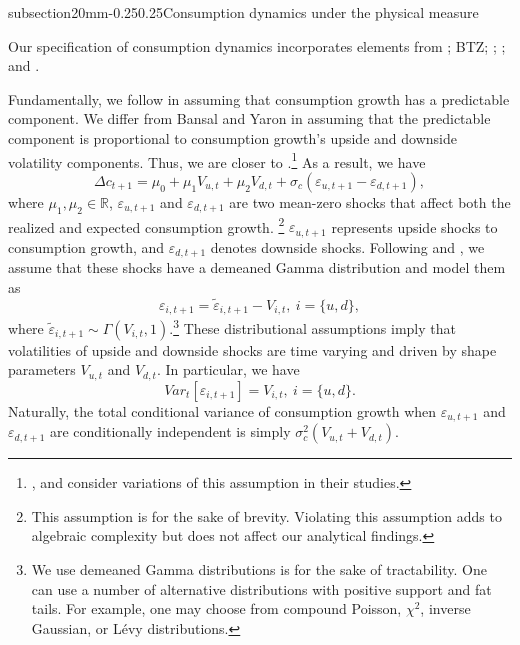 \documentclass[11pt]{article}
\makeatletter
\renewcommand\subsection{\@startsection%
    {subsection}{2}{0mm}{-0.25\baselineskip}{0.25\baselineskip}{\bfseries\large}}
\makeatother
\begin{document}
\subsection{Consumption dynamics under the physical measure}

Our specification of consumption dynamics incorporates elements from \cite%
{BansalYaron04JF}; BTZ; \cite{FJPT13RoF}; \cite{ShaliastovichYaronSegal14}; and \cite{BekaertEngstrom14}.

Fundamentally, we follow \cite{BansalYaron04JF} in assuming that consumption
growth has a predictable component. We differ from Bansal and Yaron in
assuming that the predictable component is proportional to consumption
growth's upside and downside volatility components. Thus, we are closer to \cite{ShaliastovichYaronSegal14}.\footnote{\cite{FJPT13RoF}, and \cite{BekaertEngstrom14} consider variations of this assumption in their studies.} As a result, we have
\begin{equation}  \label{EqConsGrowth}
\Delta c_{t+1} =
\mu_0+\mu_1V_{u,t}+\mu_2V_{d,t}+\sigma_c\left(\varepsilon_{u,t+1}-%
\varepsilon_{d,t+1}\right),
\end{equation}
where $\mu_1, \mu_2\in \mathbb{R}$, $\varepsilon_{u,t+1}$ and $\varepsilon_{d,t+1}$ are two mean-zero
shocks that affect both the realized and expected consumption growth.%
\footnote{%
This assumption is for the sake of brevity. Violating this assumption adds
to algebraic complexity but does not affect our analytical findings.} $%
\varepsilon_{u,t+1}$ represents upside shocks to consumption growth, and $%
\varepsilon_{d,t+1}$ denotes downside shocks. Following \cite{BekaertEngstrom14} and \cite{ShaliastovichYaronSegal14}, we
assume that these shocks have a demeaned Gamma distribution and model them
as
\begin{equation}  \label{EqGammaErrorDefs}
\varepsilon_{i,t+1}=\tilde{\varepsilon}_{i,t+1}-V_{i,t}, ~ i=\{u,d\},
\end{equation}
where $\tilde{\varepsilon}_{i,t+1}\sim \Gamma(V_{i,t},1)$.\footnote{We use demeaned Gamma distributions is for the sake of tractability. One can use a number of alternative distributions with positive support and fat tails. For example, one may choose from compound Poisson, $\chi^2$, inverse Gaussian, or L\'{e}vy distributions.} These
distributional assumptions imply that volatilities of upside and downside
shocks are time varying and driven by shape parameters $V_{u,t}$ and $%
V_{d,t} $. In particular, we have
\begin{equation}  \label{EqGammaErrosVariances}
Var_t[\varepsilon_{i,t+1}] = V_{i,t}, ~i=\{u, d\}.
\end{equation}
Naturally, the total conditional variance of consumption growth when $\varepsilon_{u,t+1}$
and $\varepsilon_{d,t+1}$ are conditionally independent is simply $%
\sigma_c^2\left(V_{u,t}+V_{d,t}\right) $.
\end{document}
